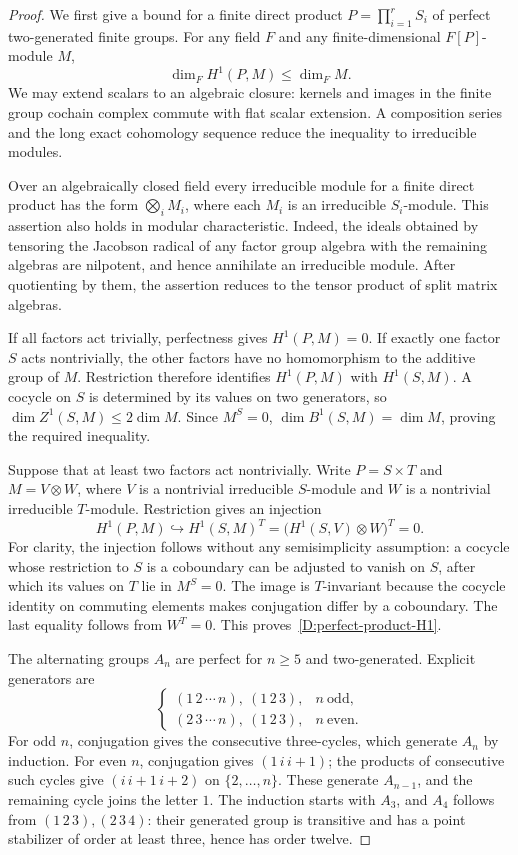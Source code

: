 \begin{proof}
We first give a bound for a finite direct product
$P=\prod_{i=1}^r S_i$ of perfect two-generated finite groups.
For any field $F$ and any finite-dimensional $F[P]$-module $M$,
\begin{equation}\label{D:perfect-product-H1}
 \dim_F H^1(P,M)\leq\dim_F M.
\end{equation}
We may extend scalars to an algebraic closure: kernels and images
in the finite group cochain complex commute with flat scalar
extension.  A composition series and the long exact cohomology
sequence reduce the inequality to irreducible modules.

Over an algebraically closed field every irreducible module for
a finite direct product has the form $\bigotimes_i M_i$, where
each $M_i$ is an irreducible $S_i$-module.  This assertion also
holds in modular characteristic.  Indeed, the ideals obtained
by tensoring the Jacobson radical of any factor group algebra
with the remaining algebras are nilpotent, and hence annihilate
an irreducible module.  After quotienting by them, the assertion
reduces to the tensor product of split matrix algebras.

If all factors act trivially, perfectness gives $H^1(P,M)=0$.
If exactly one factor $S$ acts nontrivially, the other factors
have no homomorphism to the additive group of $M$.  Restriction
therefore identifies $H^1(P,M)$ with $H^1(S,M)$.
A cocycle on $S$ is determined by its values on two generators,
so $\dim Z^1(S,M)\leq2\dim M$.  Since $M^S=0$,
$\dim B^1(S,M)=\dim M$, proving the required inequality.

Suppose that at least two factors act nontrivially.  Write
$P=S\times T$ and $M=V\otimes W$, where $V$ is a nontrivial
irreducible $S$-module and $W$ is a nontrivial irreducible
$T$-module.  Restriction gives an injection
\[
 H^1(P,M)\hookrightarrow H^1(S,M)^T
 =\bigl(H^1(S,V)\otimes W\bigr)^T=0.
\]
For clarity, the injection follows without any semisimplicity
assumption: a cocycle whose restriction to $S$ is a coboundary
can be adjusted to vanish on $S$, after which its values on
$T$ lie in $M^S=0$.  The image is $T$-invariant because the
cocycle identity on commuting elements makes conjugation differ
by a coboundary.  The last equality follows from $W^T=0$.
This proves~\eqref{D:perfect-product-H1}.

The alternating groups $A_n$ are perfect for $n\geq5$ and
two-generated.  Explicit generators are
\[
 \begin{cases}
  (1\,2\,\cdots\,n),\ (1\,2\,3),& n\ \text{odd},\\
  (2\,3\,\cdots\,n),\ (1\,2\,3),& n\ \text{even}.
 \end{cases}
\]
For odd $n$, conjugation gives the consecutive three-cycles,
which generate $A_n$ by induction.  For even $n$, conjugation
gives $(1\,i\,i+1)$; the products of consecutive such cycles
give $(i\,i+1\,i+2)$ on $\{2,\ldots,n\}$.  These generate
$A_{n-1}$, and the remaining cycle joins the letter $1$.
The induction starts with $A_3$, and $A_4$ follows from
$(1\,2\,3),(2\,3\,4)$: their generated group is transitive
and has a point stabilizer of order at least three, hence has
order twelve.


\end{proof}
